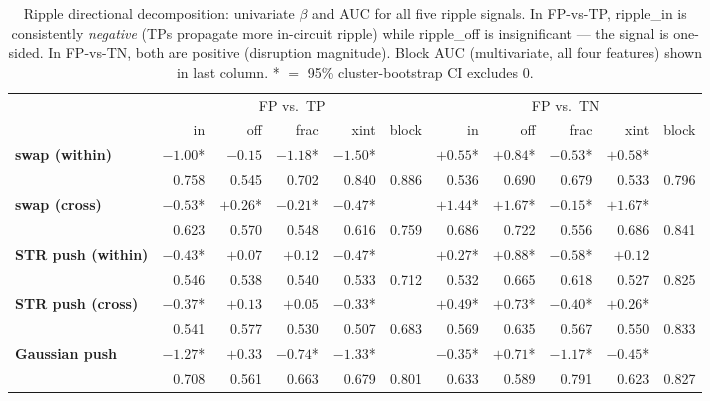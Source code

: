 \begin{table}[t]
\centering
\caption{Ripple directional decomposition: univariate $\beta$ and AUC for all five ripple signals. In FP-vs-TP, ripple\_in is consistently \emph{negative} (TPs propagate more in-circuit ripple) while ripple\_off is insignificant --- the signal is one-sided. In FP-vs-TN, both are positive (disruption magnitude). Block AUC (multivariate, all four features) shown in last column. * $=$ 95\% cluster-bootstrap CI excludes 0.}
\label{tab:ripple-direction}
\small
\begin{tabular}{l rrrr r rrrr r}
\toprule
 & \multicolumn{5}{c}{FP vs.\ TP} & \multicolumn{5}{c}{FP vs.\ TN} \\
\cmidrule(lr){2-6} \cmidrule(lr){7-11}
 & in & off & frac & xint & \scriptsize{block} & in & off & frac & xint & \scriptsize{block} \\
\midrule
\textbf{swap (within)} & $-1.00$* & $-0.15$ & $-1.18$* & $-1.50$* &  & $+0.55$* & $+0.84$* & $-0.53$* & $+0.58$* &  \\
 & \scriptsize{0.758} & \scriptsize{0.545} & \scriptsize{0.702} & \scriptsize{0.840} & \scriptsize{0.886} & \scriptsize{0.536} & \scriptsize{0.690} & \scriptsize{0.679} & \scriptsize{0.533} & \scriptsize{0.796} \\[2pt]
\textbf{swap (cross)} & $-0.53$* & $+0.26$* & $-0.21$* & $-0.47$* &  & $+1.44$* & $+1.67$* & $-0.15$* & $+1.67$* &  \\
 & \scriptsize{0.623} & \scriptsize{0.570} & \scriptsize{0.548} & \scriptsize{0.616} & \scriptsize{0.759} & \scriptsize{0.686} & \scriptsize{0.722} & \scriptsize{0.556} & \scriptsize{0.686} & \scriptsize{0.841} \\[2pt]
\textbf{STR push (within)} & $-0.43$* & $+0.07$ & $+0.12$ & $-0.47$* &  & $+0.27$* & $+0.88$* & $-0.58$* & $+0.12$ &  \\
 & \scriptsize{0.546} & \scriptsize{0.538} & \scriptsize{0.540} & \scriptsize{0.533} & \scriptsize{0.712} & \scriptsize{0.532} & \scriptsize{0.665} & \scriptsize{0.618} & \scriptsize{0.527} & \scriptsize{0.825} \\[2pt]
\textbf{STR push (cross)} & $-0.37$* & $+0.13$ & $+0.05$ & $-0.33$* &  & $+0.49$* & $+0.73$* & $-0.40$* & $+0.26$* &  \\
 & \scriptsize{0.541} & \scriptsize{0.577} & \scriptsize{0.530} & \scriptsize{0.507} & \scriptsize{0.683} & \scriptsize{0.569} & \scriptsize{0.635} & \scriptsize{0.567} & \scriptsize{0.550} & \scriptsize{0.833} \\[2pt]
\textbf{Gaussian push} & $-1.27$* & $+0.33$ & $-0.74$* & $-1.33$* &  & $-0.35$* & $+0.71$* & $-1.17$* & $-0.45$* &  \\
 & \scriptsize{0.708} & \scriptsize{0.561} & \scriptsize{0.663} & \scriptsize{0.679} & \scriptsize{0.801} & \scriptsize{0.633} & \scriptsize{0.589} & \scriptsize{0.791} & \scriptsize{0.623} & \scriptsize{0.827} \\[2pt]
\bottomrule
\end{tabular}
\end{table}
